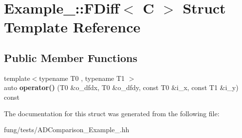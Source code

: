 \hypertarget{structExample__4_1_1FDiff}{\section{Example\-\_\-:\-:F\-Diff$<$ C $>$ Struct Template Reference}
\label{structExample__4_1_1FDiff}
}
\subsection*{Public Member Functions}
\begin{DoxyCompactItemize}
\item 
\hypertarget{structExample__4_1_1FDiff_af13f7f08c32a9ef4189c39aa8fb7faf0}{{\footnotesize template$<$typename T0 , typename T1 $>$ }\\auto {\bfseries operator()} (T0 \&o\-\_\-dfdx, T0 \&o\-\_\-dfdy, const T0 \&i\-\_\-x, const T1 \&i\-\_\-y) const }\label{structExample__4_1_1FDiff_af13f7f08c32a9ef4189c39aa8fb7faf0}

\end{DoxyCompactItemize}


The documentation for this struct was generated from the following file\-:\begin{DoxyCompactItemize}
\item 
fung/tests/A\-D\-Comparison\-\_\-\-Example\-\_.\-hh\end{DoxyCompactItemize}
